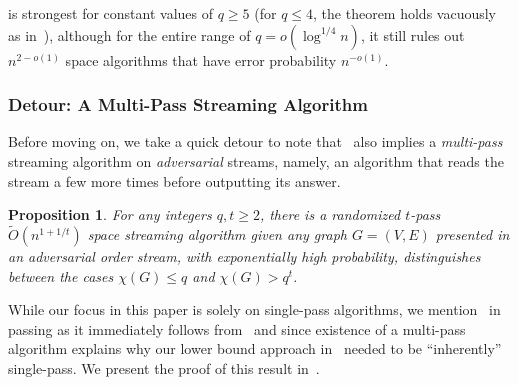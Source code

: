 \documentclass[11pt]{article}
\newtheorem{proposition}[lemma]{Proposition}
\newtheorem{mdresult}{Result}
\newenvironment{result}{\begin{mdframed}[backgroundcolor=lightgray!40,topline=false,rightline=false,leftline=false,bottomline=false,innertopmargin=5pt]\begin{mdresult}}{\end{mdresult}\end{mdframed}}
\theoremstyle{definition}
\renewcommand{\leq}{\leqslant}
\renewcommand{\geq}{\geqslant}
\newcommand{\Ot}{\ensuremath{\widetilde{O}}}
\newcommand{\poly}{\mbox{\rm poly}}
\begin{document}
 is strongest for constant values of $q \geq 5$ (for $q \leq 4$, the theorem holds vacuously as in~), although for the entire range of $q=o(\log^{1/4}{n})$, it still rules out $n^{2-o(1)}$ space algorithms that have error probability $n^{-o(1)}$. 

\subsubsection*{Detour: A Multi-Pass Streaming Algorithm} 
Before moving on, we take a quick detour to note that~ also implies a \emph{multi-pass} streaming
algorithm on \emph{adversarial} streams, namely, an algorithm that reads the stream a few more times before outputting its answer. 

\begin{proposition}\label{prop:multi-pass}
	For any integers $q , t \geq 2$, there is a randomized $t$-pass $\Ot(n^{1+1/t})$ space streaming algorithm given any graph $G=(V,E)$ presented in an adversarial order stream, 
	with exponentially high probability, distinguishes between the cases $\chi(G) \leq q$ and $\chi(G) > q^t$. 
\end{proposition}

While our focus in this paper is solely on single-pass algorithms, we mention~ in passing as it immediately follows from~
and since existence of a multi-pass algorithm explains why our lower bound approach in~ needed to be ``inherently'' single-pass. 
We present the proof of this result in~. 
	


\end{document}
